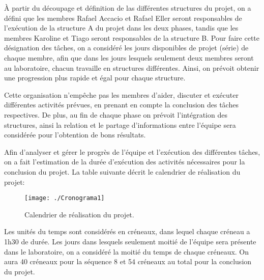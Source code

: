 
À partir du découpage et définition de las différentes structures du projet, on a défini que les membres Rafael Accacio et Rafael Eller seront responsables de l'exécution de la structure A du projet dans les deux phases, tandis que les membres Karoline et Tiago seront responsables de la structure B. Pour faire cette désignation des tâches, on a considéré les jours disponibles de projet (série) de chaque membre, afin que dans les jours lesquels seulement deux membres seront au laboratoire, chacun travaille en structures différentes. 	Ainsi, on prévoit obtenir une progression plus rapide et égal pour chaque structure.  

Cette organisation n’empêche pas les membres d’aider, discuter et exécuter différentes activités prévues, en prenant en compte la conclusion des tâches respectives. De plus, au fin de chaque phase on prévoit l’intégration des structures, ainsi la relation et le partage d’informations entre l’équipe sera considérée pour l’obtention de bons résultats. 


Afin d’analyser et gérer le progrès de l’équipe et l'exécution des différentes tâches, on a fait l’estimation de la durée d’exécution des activités nécessaires pour la conclusion du projet. La table suivante décrit le calendrier de réalisation du projet: 

\begin{figure}[H]
	\begin{center}	
		\texttt{[image: ./Cronograma1]}
		\caption{Calendrier de réalisation du projet.}
		\label{fig:cronograma}
	\end{center}
\end{figure}

Les unités du temps sont considérés en créneaux, dans lequel chaque créneau a 1h30 de durée. Les jours dans lesquels seulement moitié de l’équipe sera présente dans le laboratoire, on a considéré la moitié du temps de chaque créneaux. 
On aura 40 créneaux pour la séquence 8 et 54 créneaux au total pour la conclusion du projet.






